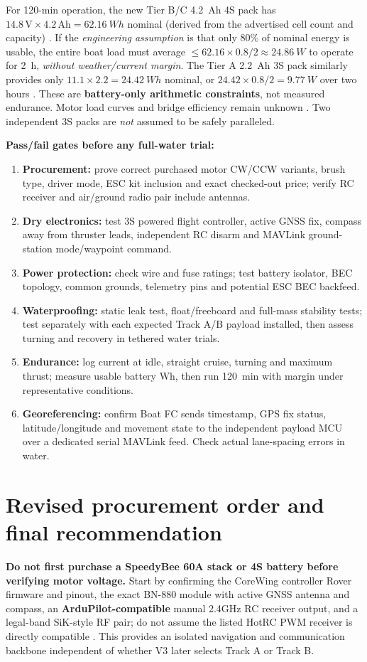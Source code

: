 For 120-min operation, the new Tier B/C \SI{4.2}{Ah} 4S pack has $14.8\,\mathrm{V}\times4.2\,\mathrm{Ah}=\SI{62.16}{Wh}$ nominal (derived from the advertised cell count and capacity) \cite{bat4Shopee}. If the \emph{engineering assumption} is that only 80\% of nominal energy is usable, the entire boat load must average $\leq 62.16\times0.8/2\approx\SI{24.86}{W}$ to operate for \SI{2}{h}, \emph{without weather/current margin}. The Tier A \SI{2.2}{Ah} 3S pack similarly provides only $11.1\times2.2=\SI{24.42}{Wh}$ nominal, or $24.42\times0.8/2=\SI{9.77}{W}$ over two hours \cite{bat22}. These are \textbf{battery-only arithmetic constraints}, not measured endurance. Motor load curves and bridge efficiency remain unknown \cite{jetShop,hobbyShop,m060Shop}. Two independent 3S packs are \emph{not} assumed to be safely paralleled.

\textbf{Pass/fail gates before any full-water trial:}
\begin{enumerate}[leftmargin=*,itemsep=2pt]
\item \textbf{Procurement:} prove correct purchased motor CW/CCW variants, brush type, driver mode, ESC kit inclusion and exact checked-out price; verify RC receiver and air/ground radio pair include antennas.
\item \textbf{Dry electronics:} test 3S powered flight controller, active GNSS fix, compass away from thruster leads, independent RC disarm and MAVLink ground-station mode/waypoint command.
\item \textbf{Power protection:} check wire and fuse ratings; test battery isolator, BEC topology, common grounds, telemetry pins and potential ESC BEC backfeed.
\item \textbf{Waterproofing:} static leak test, float/freeboard and full-mass stability tests; test separately with each expected Track A/B payload installed, then assess turning and recovery in tethered water trials.
\item \textbf{Endurance:} log current at idle, straight cruise, turning and maximum thrust; measure usable battery Wh, then run \SI{120}{min} with margin under representative conditions.
\item \textbf{Georeferencing:} confirm Boat FC sends timestamp, GPS fix status, latitude/longitude and movement state to the independent payload MCU over a dedicated serial MAVLink feed. Check actual lane-spacing errors in water.
\end{enumerate}

\section{Revised procurement order and final recommendation}
\textbf{Do not first purchase a SpeedyBee 60A stack or 4S battery before verifying motor voltage.} Start by confirming the CoreWing controller Rover firmware and pinout, the exact BN-880 module with active GNSS antenna and compass, an \textbf{ArduPilot-compatible} manual 2.4GHz RC receiver output, and a legal-band SiK-style RF pair; do not assume the listed HotRC PWM receiver is directly compatible \cite{coreDoc,bnData,hotrc,radioDoc}. This provides an isolated navigation and communication backbone independent of whether V3 later selects Track A or Track B.

